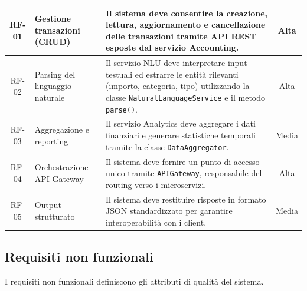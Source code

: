 \begin{small}
\begin{longtable}{|c|p{4cm}|p{6cm}|c|}
        RF-01       & Gestione transazioni (CRUD)     & Il sistema deve consentire la creazione, lettura, aggiornamento e cancellazione delle transazioni tramite API REST esposte dal servizio Accounting.                                             & Alta              \\ \hline
        RF-02       & Parsing del linguaggio naturale & Il servizio NLU deve interpretare input testuali ed estrarre le entità rilevanti (importo, categoria, tipo) utilizzando la classe \texttt{NaturalLanguageService} e il metodo \texttt{parse()}. & Alta              \\ \hline
        RF-03       & Aggregazione e reporting        & Il servizio Analytics deve aggregare i dati finanziari e generare statistiche temporali tramite la classe \texttt{DataAggregator}.                                                              & Media             \\ \hline
        RF-04       & Orchestrazione API Gateway      & Il sistema deve fornire un punto di accesso unico tramite \texttt{APIGateway}, responsabile del routing verso i microservizi.                                                                   & Alta              \\ \hline
        RF-05       & Output strutturato              & Il sistema deve restituire risposte in formato JSON standardizzato per garantire interoperabilità con i client.                                                                                 & Media             \\ \hline
    \end{longtable}
\end{small}

\subsection{Requisiti non funzionali}

I requisiti non funzionali definiscono gli attributi di qualità del sistema.

